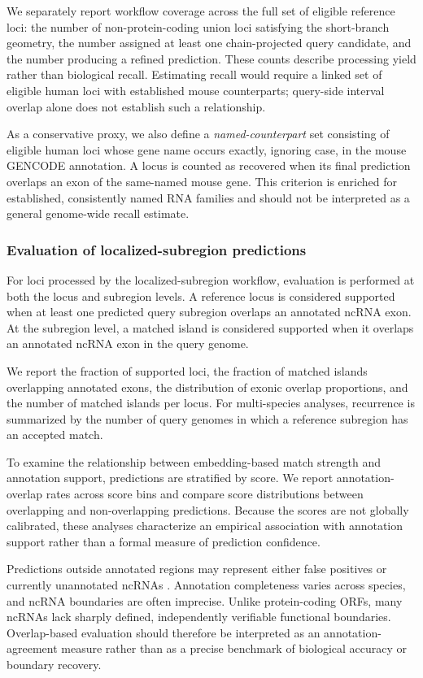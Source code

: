 We separately report workflow coverage across the full set of eligible reference
loci: the number of non-protein-coding union loci satisfying the short-branch
geometry, the number assigned at least one chain-projected query candidate, and
the number producing a refined prediction. These counts describe processing
yield rather than biological recall. Estimating recall would require a linked
set of eligible human loci with established mouse counterparts; query-side
interval overlap alone does not establish such a relationship.

As a conservative proxy, we also define a \emph{named-counterpart} set consisting
of eligible human loci whose gene name occurs exactly, ignoring case, in the
mouse GENCODE annotation. A locus is counted as recovered when its final
prediction overlaps an exon of the same-named mouse gene. This criterion is
enriched for established, consistently named RNA families and should not be
interpreted as a general genome-wide recall estimate.

\subsubsection{Evaluation of localized-subregion predictions}

For loci processed by the localized-subregion workflow, evaluation is performed
at both the locus and subregion levels. A reference locus is considered supported
when at least one predicted query subregion overlaps an annotated ncRNA exon. At
the subregion level, a matched island is considered supported when it overlaps an
annotated ncRNA exon in the query genome.

We report the fraction of supported loci, the fraction of matched islands
overlapping annotated exons, the distribution of exonic overlap proportions, and
the number of matched islands per locus. For multi-species analyses, recurrence
is summarized by the number of query genomes in which a reference subregion has
an accepted match.

To examine the relationship between embedding-based match strength and annotation
support, predictions are stratified by score. We report annotation-overlap rates
across score bins and compare score distributions between overlapping and
non-overlapping predictions. Because the scores are not globally calibrated,
these analyses characterize an empirical association with annotation support
rather than a formal measure of prediction confidence.

Predictions outside annotated regions may represent either false positives or
currently unannotated ncRNAs
\citep{hezroniPrinciplesLongNoncoding2015,
    mattickLongNoncodingRNAs2023,
    perteaCHESSNewHuman2018}.
Annotation completeness varies across species, and ncRNA boundaries are often
imprecise. Unlike protein-coding ORFs, many ncRNAs lack sharply defined,
independently verifiable functional boundaries. Overlap-based evaluation should
therefore be interpreted as an annotation-agreement measure rather than as a
precise benchmark of biological accuracy or boundary recovery.

